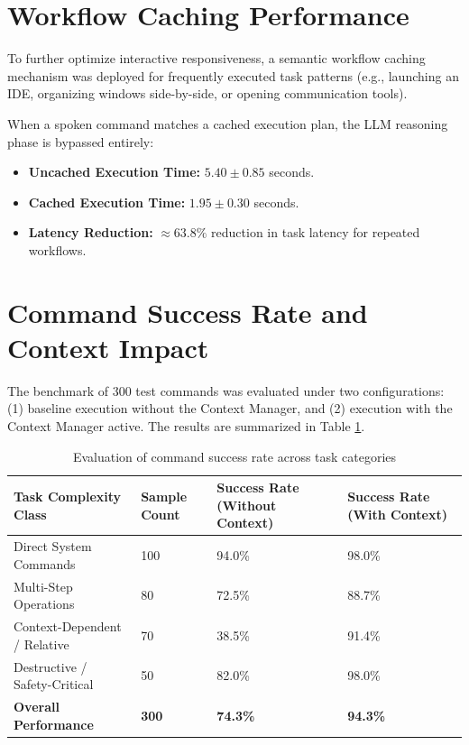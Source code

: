 \documentclass[12pt,a4paper]{report}
\begin{document}
\section{Workflow Caching Performance}
To further optimize interactive responsiveness, a semantic workflow caching mechanism was deployed for frequently executed task patterns (e.g., launching an IDE, organizing windows side-by-side, or opening communication tools). 

When a spoken command matches a cached execution plan, the LLM reasoning phase is bypassed entirely:
\begin{itemize}
    \item \textbf{Uncached Execution Time:} $5.40 \pm 0.85$ seconds.
    \item \textbf{Cached Execution Time:} $1.95 \pm 0.30$ seconds.
    \item \textbf{Latency Reduction:} $\approx 63.8\%$ reduction in task latency for repeated workflows.
\end{itemize}

\section{Command Success Rate and Context Impact}
The benchmark of 300 test commands was evaluated under two configurations: (1) baseline execution without the Context Manager, and (2) execution with the Context Manager active. The results are summarized in Table \ref{tab:benchmark_results}.

\begin{table}[h!]
	\centering
	\caption{Evaluation of command success rate across task categories}
	\label{tab:benchmark_results}
	\vspace*{8pt}
	\begin{tabular}{p{5cm} p{2.2cm} p{3.5cm} p{3.5cm}}
		\toprule
		\textbf{Task Complexity Class} & \textbf{Sample Count} & \textbf{Success Rate (Without Context)} & \textbf{Success Rate (With Context)} \\
		\midrule
		Direct System Commands & 100 & 94.0\% & 98.0\% \\
		Multi-Step Operations & 80 & 72.5\% & 88.7\% \\
		Context-Dependent / Relative & 70 & 38.5\% & 91.4\% \\
		Destructive / Safety-Critical & 50 & 82.0\% & 98.0\% \\
		\midrule
		\textbf{Overall Performance} & \textbf{300} & \textbf{74.3\%} & \textbf{94.3\%} \\
		\bottomrule
	\end{tabular}
\end{table}
\end{document}
